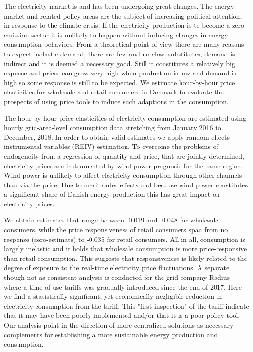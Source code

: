 \label{sec:conclusion}
The electricity market is and has been undergoing great changes. The energy market and related policy areas are the subject of increasing political attention, in response to the climate crisis. If the electricity production is to become a zero-emission sector it is unlikely to happen without inducing changes in energy consumption behaviors. From a theoretical point of view there are many reasons to expect inelastic demand; there are few and no close substitutes, demand is indirect and it is deemed a necessary good. Still it constitutes a relatively big expense and prices can grow very high when production is low and demand is high so some response is still to be expected. We estimate hour-by-hour price elasticities for wholesale and retail consumers in Denmark to evaluate the prospects of using price tools to induce such adaptions in the consumption. \bigskip \par
The hour-by-hour price elasticities of electricity consumption are estimated using hourly grid-area-level consumption data stretching from January 2016 to December, 2018. In order to obtain valid estimates we apply random effects instrumental variables (REIV) estimation. To overcome the problems of endogeneity from a regression of quantity and price, that are jointly determined, electricity prices are instrumented by wind power prognosis for the same region. Wind-power is unlikely to affect electricity consumption through other channels than via the price. Due to merit order effects and because wind power constitutes a significant share of Danish energy production this has great impact on electricity prices.
\bigskip\par
We obtain estimates that range between -0.019 and -0.048 for wholesale consumers, while the price responsiveness of retail consumers span from no response (zero-estimate) to -0.035 for retail consumers. All in all, consumption is largely inelastic and it holds that wholesale consumption is more price-responsive than retail consumption. This suggests that responsiveness is likely related to the degree of exposure to the real-time electricity price fluctuations. A separate though not as consistent analysis is conducted for the grid-company Radius where a time-of-use tariffs was gradually introduced since the end of 2017. Here we find a statistically significant, yet economically negligible reduction in electricity consumption from the tariff. This "first-inspection" of the tariff indicate that it may have been poorly implemented and/or that it is a poor policy tool. Our analysis point in the direction of more centralized solutions as necessary complements for establishing a more sustainable energy production and consumption.
\begin{comment}

Literature in this field is quite large but there is still substantial room for improvement, especially within the field of estimating hour-by-hour responses at the micro-level to capture heterogeneity in this aspect.
\end{comment}
